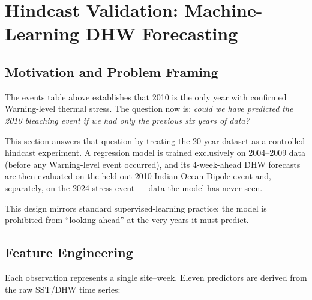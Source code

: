 \documentclass[12pt,a4paper]{report}
\begin{document}
\section{Hindcast Validation: Machine-Learning DHW Forecasting}
\label{sec:hindcast}

\subsection{Motivation and Problem Framing}

The events table above establishes that 2010 is the only year with confirmed
Warning-level thermal stress.  The question now is: \textit{could we have predicted
the 2010 bleaching event if we had only the previous six years of data?}

This section answers that question by treating the 20-year dataset as a controlled
hindcast experiment.  A regression model is trained exclusively on 2004--2009 data (before
any Warning-level event occurred), and its 4-week-ahead DHW forecasts are then evaluated
on the held-out 2010 Indian Ocean Dipole event and, separately, on the 2024 stress event
--- data the model has never seen.

This design mirrors standard supervised-learning practice: the model is prohibited from
``looking ahead'' at the very years it must predict.

\subsection{Feature Engineering}

Each observation represents a single site--week.  Eleven predictors are derived from
the raw SST/DHW time series:
\end{document}
